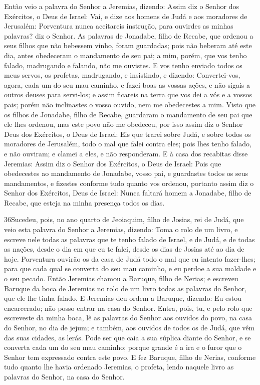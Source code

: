 Então veio a palavra do Senhor a Jeremias, dizendo: Assim
diz o Senhor dos Exércitos, o Deus de Israel: Vai, e dize aos homens
de Judá e aos moradores de Jerusalém: Porventura nunca aceitareis
instrução, para ouvirdes as minhas palavras? diz o Senhor. As
palavras de Jonadabe, filho de Recabe, que ordenou a seus filhos que
não bebessem vinho, foram guardadas; pois não beberam até este dia,
antes obedeceram o mandamento de seu pai; a mim, porém, que vos
tenho falado, madrugando e falando, não me ouvistes. E vos
tenho enviado todos os meus servos, os profetas, madrugando, e
insistindo, e dizendo: Convertei-vos, agora, cada um do seu mau
caminho, e fazei boas as vossas ações, e não sigais a outros deuses
para servi-los; e assim ficareis na terra que vos dei a vós e a
vossos pais; porém não inclinastes o vosso ouvido, nem me
obedecestes a mim. Visto que os filhos de Jonadabe, filho de
Recabe, guardaram o mandamento de seu pai que ele lhes ordenou, mas
este povo não me obedeceu, por isso assim diz o Senhor Deus
dos Exércitos, o Deus de Israel: Eis que trarei sobre Judá, e sobre
todos os moradores de Jerusalém, todo o mal que falei contra eles;
pois lhes tenho falado, e não ouviram; e clamei a eles, e não
responderam. E à casa dos recabitas disse Jeremias: Assim diz
o Senhor dos Exércitos, o Deus de Israel: Pois que obedecestes ao
mandamento de Jonadabe, vosso pai, e guardastes todos os seus
mandamentos, e fizestes conforme tudo quanto vos ordenou,
portanto assim diz o Senhor dos Exércitos, Deus de Israel:
Nunca faltará homem a Jonadabe, filho de Recabe, que esteja na minha
presença todos os dias.

\medskip

\lettrine{36} Sucedeu, pois, no ano quarto de Jeoiaquim, filho
de Josias, rei de Judá, que veio esta palavra do Senhor a Jeremias,
dizendo: Toma o rolo de um livro, e escreve nele todas as
palavras que te tenho falado de Israel, e de Judá, e de todas as
nações, desde o dia em que eu te falei, desde os dias de Josias até
ao dia de hoje. Porventura ouvirão os da casa de Judá todo o mal
que eu intento fazer-lhes; para que cada qual se converta do seu mau
caminho, e eu perdoe a sua maldade e o seu pecado. Então
Jeremias chamou a Baruque, filho de Nerias; e escreveu Baruque da
boca de Jeremias no rolo de um livro todas as palavras do Senhor,
que ele lhe tinha falado. E Jeremias deu ordem a Baruque,
dizendo: Eu estou encarcerado; não posso entrar na casa do Senhor.
Entra, pois, tu, e pelo rolo que escreveste da minha boca, lê as
palavras do Senhor aos ouvidos do povo, na casa do Senhor, no dia de
jejum; e também, aos ouvidos de todos os de Judá, que vêm das suas
cidades, as lerás. Pode ser que caia a sua súplica diante do
Senhor, e se converta cada um do seu mau caminho; porque grande é a
ira e o furor que o Senhor tem expressado contra este povo. E
fez Baruque, filho de Nerias, conforme tudo quanto lhe havia
ordenado Jeremias, o profeta, lendo naquele livro as palavras do
Senhor, na casa do Senhor.

